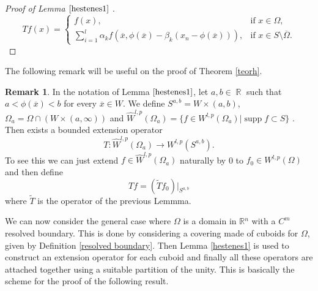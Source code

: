 \documentclass[12pt]{article}
\theoremstyle{definition}
\newtheorem{remark}{Remark}
\DeclareMathOperator\supp{supp}
\DeclareMathOperator\rr{\mathbb{R}}
\begin{document}
\begin{proof}[Proof of Lemma $\ref{hestenes1}$ ]
\[ Tf(x) = \begin{cases}
		f(x), & \text{if } x \in \Omega,\\
		\sum_{i=1}^l \alpha_k f(\overline x, \phi(\overline x)- \beta_k(x_n-\phi(\overline x))), & \text{if } x \in S \setminus \overline \Omega.
\end{cases} 
\]
\end{proof}


The following remark will be useful on the proof of Theorem \ref{teorh}.


\begin{remark}\label{hestenesr}{}
In the notation of Lemma $\ref{hestenes1}$, let $a,b \in \rr$ such that $a<\phi(\overline x) <b$ for every $\overline x \in W$. We define $S^{a,b}=W\times (a,b)$, $\Omega_a=\Omega \cap (W \times (a,\infty))$ and $\widehat W^{l,p}(\Omega_a)=\{f \in W^{l,p}(\Omega_a) | \supp f \subset S\}$ . Then exists a bounded extension operator
\[ T: \widehat W^{l,p}(\Omega_a)\rightarrow W^{l,p}(S^{a,b}).\]
To see this we can just extend $f\in \widehat W^{l,p}(\Omega_a)$ naturally by 0 to  $f_0\in W^{l,p}(\Omega)$ and then define
\[ Tf=(\widetilde T f_0)\big|_{S^{a,b}}\]
where $\widetilde T$ is the operator of the previous Lemmma.
\end{remark}
We can now consider the general case where $\Omega$ is a domain in $\mathbb{R}{}^n$ with a $C^m$ resolved boundary. This is done by considering a covering made of cuboids for $\Omega$, given by Definition \ref{resolved boundary}. Then Lemma \ref{hestenes1} is used to construct an extension operator for each cuboid and finally all these operators are attached together using a suitable partition of the unity. This is basically the scheme for the proof of the following result.
\end{document}
